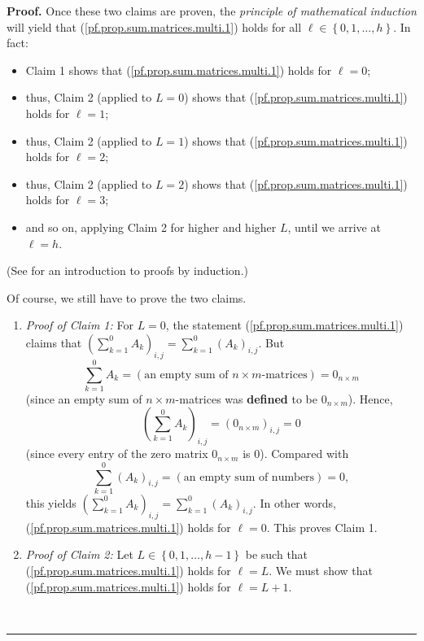 \documentclass[numbers=enddot,12pt,final,onecolumn,notitlepage]{scrartcl}%
\theoremstyle{definition}
\newenvironment{proof}[1][Proof]{\noindent\textbf{#1.} }{\ \rule{0.5em}{0.5em}}
\let\sumnonlimits\sum
\renewcommand{\sum}{\sumnonlimits\limits}
\begin{document}
\begin{proof}
Once these two claims are proven, the \textit{principle of mathematical
induction} will yield that (\ref{pf.prop.sum.matrices.multi.1}) holds for all
$\ell\in\left\{  0,1,\ldots,h\right\}  $. In fact:

\begin{itemize}
\item Claim 1 shows that (\ref{pf.prop.sum.matrices.multi.1}) holds for
$\ell=0$;

\item thus, Claim 2 (applied to $L=0$) shows that
(\ref{pf.prop.sum.matrices.multi.1}) holds for $\ell=1$;

\item thus, Claim 2 (applied to $L=1$) shows that
(\ref{pf.prop.sum.matrices.multi.1}) holds for $\ell=2$;

\item thus, Claim 2 (applied to $L=2$) shows that
(\ref{pf.prop.sum.matrices.multi.1}) holds for $\ell=3$;

\item and so on, applying Claim 2 for higher and higher $L$, until we arrive
at $\ell=h$.
\end{itemize}

(See \cite[Chapter 5]{LeLeMe16} for an introduction to proofs by induction.)

Of course, we still have to prove the two claims.

\begin{enumerate}
\item \textit{Proof of Claim 1:} For $L=0$, the statement
(\ref{pf.prop.sum.matrices.multi.1}) claims that $\left(  \sum_{k=1}^{0}%
A_{k}\right)  _{i,j}=\sum_{k=1}^{0}\left(  A_{k}\right)  _{i,j}$. But
\[
\sum_{k=1}^{0}A_{k}=\left(  \text{an empty sum of }n\times m\text{-matrices}%
\right)  =0_{n\times m}%
\]
(since an empty sum of $n\times m$-matrices was \textbf{defined} to be
$0_{n\times m}$). Hence,%
\[
\left(  \sum_{k=1}^{0}A_{k}\right)  _{i,j}=\left(  0_{n\times m}\right)
_{i,j}=0
\]
(since every entry of the zero matrix $0_{n\times m}$ is $0$). Compared with
\[
\sum_{k=1}^{0}\left(  A_{k}\right)  _{i,j}=\left(  \text{an empty sum of
numbers}\right)  =0,
\]
this yields $\left(  \sum_{k=1}^{0}A_{k}\right)  _{i,j}=\sum_{k=1}^{0}\left(
A_{k}\right)  _{i,j}$. In other words, (\ref{pf.prop.sum.matrices.multi.1})
holds for $\ell=0$. This proves Claim 1.

\item \textit{Proof of Claim 2:} Let $L\in\left\{  0,1,\ldots,h-1\right\}  $
be such that (\ref{pf.prop.sum.matrices.multi.1}) holds for $\ell=L$. We must
show that (\ref{pf.prop.sum.matrices.multi.1}) holds for $\ell=L+1$.


\end{enumerate}
\end{proof}
\end{document}
